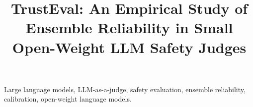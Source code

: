 \documentclass[conference]{IEEEtran}
\begin{document}
\title{TrustEval: An Empirical Study of Ensemble Reliability in Small Open-Weight LLM Safety Judges}

\author{
}

\maketitle

\begin{abstract}

\end{abstract}

\begin{IEEEkeywords}
Large language models, LLM-as-a-judge, safety evaluation, ensemble reliability, calibration, open-weight language models.
\end{IEEEkeywords}













\appendices


\end{document}
